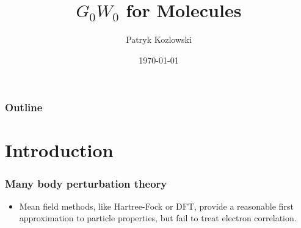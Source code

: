 \documentclass{beamer}
\begin{document}
\title{$G_0W_0$ for Molecules}
\author{Patryk Kozlowski}
\date{\today}
\begin{frame}
\titlepage
\end{frame}
\begin{frame}
\frametitle{Outline}
\tableofcontents
\end{frame}
\section{Introduction}
\begin{frame}
\frametitle{Many body perturbation theory}
\begin{itemize}
\item Mean field methods, like Hartree-Fock or DFT, provide a reasonable first approximation to particle properties, but fail to treat electron correlation. 
\end{itemize}
\end{frame}
\end{document}
